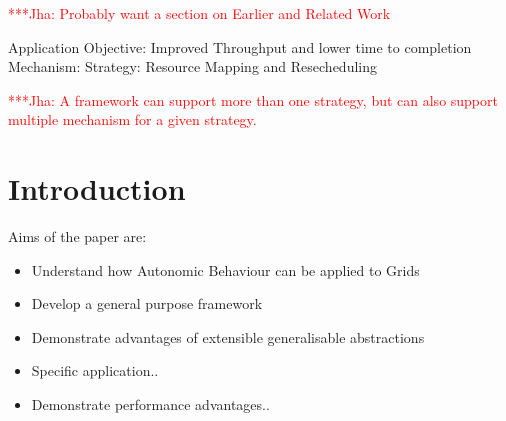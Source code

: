 \documentclass[conference,final]{IEEEtran}
\newcommand{\jhanote}[1]{ {\textcolor{red} { ***Jha: #1 }}}
\newcommand{\yyenote}[1]{ {\textcolor{blue} { ***yye00: #1 }}}
\newcommand{\jhanote}[1]{}
\newcommand{\yyenote}[1]{}
\begin{document}
\jhanote{Probably want a section on Earlier and Related Work}


Application Objective: Improved Throughput and lower time to completion
Mechanism:
Strategy: Resource Mapping and Resecheduling

\jhanote{A framework can support more than one strategy, but can also
  support multiple mechanism for a given strategy.}


\section{Introduction}


Aims of the paper are:
\begin{itemize}
\item Understand how Autonomic Behaviour can be applied to Grids
\item Develop a general purpose framework 
\item Demonstrate advantages of extensible
  generalisable abstractions
\item Specific application..
\item Demonstrate performance advantages..
\end{itemize}
\end{document}
